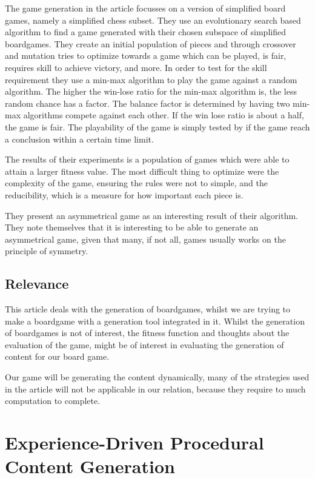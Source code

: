 \documentclass[a4paper,11pt]{article}
\begin{document}
The game generation in the article focusses on a version of simplified board games, namely a simplified chess subset. 
They use an evolutionary search based algorithm to find a game generated with their chosen subspace of simplified boardgames. They create an initial population of pieces and through crossover and mutation tries to optimize towards a game which can be played, is fair, requires skill to achieve victory, and more.
In order to test for the skill requirement they use a min-max algorithm to play the game against a random algorithm. The higher the win-lose ratio for the min-max algorithm is, the less random chance has a factor. 
The balance factor is determined by having two min-max algorithms compete against each other. If the win lose ratio is about a half, the game is fair. 
The playability of the game is simply tested by if the game reach a conclusion within a certain time limit. 

The results of their experiments is a population of games which were able to attain a larger fitness value. The most difficult thing to optimize were the complexity of the game, ensuring the rules were not to simple, and the 	reducibility, which is a measure for how important each piece is. 

They present an asymmetrical game as an interesting result of their algorithm. They note themselves that it is interesting to be able to generate an asymmetrical game, given that many, if not all, games usually works on the principle of symmetry. 

\subsection{Relevance}
This article deals with the generation of boardgames, whilst we are trying to make a boardgame with a generation tool integrated in it. 
Whilst the generation of boardgames is not of interest, the fitness function and thoughts about the evaluation of the game, might be of interest in evaluating the generation of content for our board game.

Our game will be generating the content dynamically, many of the strategies used in the article will not be applicable in our relation, because they require to much computation to complete. 

\pagebreak

\section{Experience-Driven Procedural Content Generation}
\end{document}
